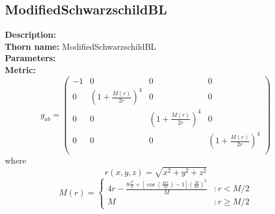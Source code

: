 \subsection{ModifiedSchwarzschildBL}
{\bf Description:}   \\
{\bf Thorn name:} ModifiedSchwarzschildBL \\
{\bf Parameters:}  \\
{\bf Metric:} \\
\begin{equation}
g_{ab} =
\left(
\begin{array}{cccc}
 -1 & 0 & 0 & 0 \\
 0 & \left(1+\frac{M(r)}{2 r}\right)^4 & 0 & 0 \\
 0 & 0 & \left(1+\frac{M(r)}{2 r}\right)^4 & 0 \\
 0 & 0 & 0 & \left(1+\frac{M(r)}{2 r}\right)^4 \\
\end{array}
\right)
\end{equation}
where
\begin{equation}
r(x,y,z)=\sqrt{x^2+y^2+z^2}
\end{equation}
\begin{equation}
M(r) = \left\{
     \begin{array}{lr}
       4 r - \frac{8 \frac{r^2}{2} + [\cos(\frac{4 \pi r}{M}) - 1] \left(\frac{M}{4 \pi}\right)^2}{M} & : r < M/2\\
       M & : r \ge M/2
     \end{array}
   \right.
\end{equation}
